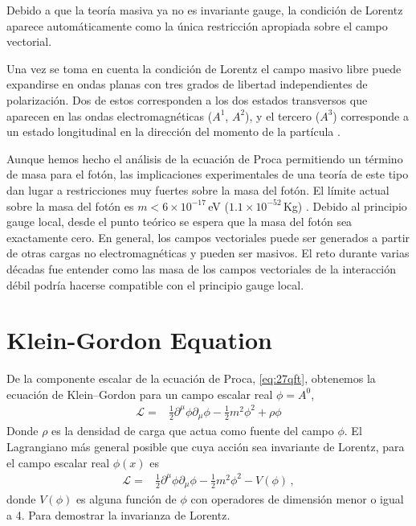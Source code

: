 Debido a que la teoría masiva ya no es invariante gauge, la condición
de Lorentz aparece automáticamente como la única restricción apropiada
sobre el campo vectorial.

Una vez se toma en cuenta la condición de Lorentz el campo masivo
libre puede expandirse en ondas planas con tres grados de libertad
independientes de polarización. Dos de estos corresponden a los dos
estados transversos que aparecen en las ondas electromagnéticas
($A^1$, $A^2$), y el tercero ($A^3$) corresponde a un estado
longitudinal en la dirección del momento de la partícula \cite{Gross}.

Aunque hemos hecho el análisis de la ecuación de Proca permitiendo un
término de masa para el fotón, las implicaciones experimentales de una
teoría de este tipo dan lugar a restricciones muy fuertes sobre la
masa del fotón\cite{Goldhaber:1971mr}. El límite actual sobre la masa
del fotón es $m\lt 6\times 10^{-17}\,$eV ($1.1\times 10^{-52}\,$Kg)
\cite{Yao:2006px}. Debido al principio gauge local, desde el punto
teórico se espera que la masa del fotón sea exactamente cero. En
general, los campos vectoriales puede ser generados a partir de otras
cargas no electromagnéticas y pueden ser masivos. El reto durante
varias décadas fue entender como las masa de los campos vectoriales de
la interacción débil podría hacerse compatible con el principio gauge
local.  


\section{Klein-Gordon Equation}
\label{sec:klein-gord-equat}

De la componente escalar de la ecuación de Proca, \eqref{eq:27qft}, obtenemos la ecuación de Klein--Gordon para un campo escalar real $\phi=A^0$,
\begin{align}
  \label{eq:kge}
  \mathcal{L}=&\frac{1}{2}\partial^\mu\phi\partial_\mu\phi-\frac{1}{2}m^2\phi^2+\rho\phi
\end{align}
Donde $\rho$ es la densidad de carga que actua como fuente del campo $\phi$. El Lagrangiano más general posible que cuya acción sea invariante de Lorentz, para el campo escalar real $\phi(x)$ es
\begin{align}
 \label{eq:kgeall}
   \mathcal{L}=&\frac{1}{2}\partial^\mu\phi\partial_\mu\phi-\frac{1}{2}m^2\phi^2-V(\phi)\,,
\end{align}
donde $V(\phi)$ es alguna función de $\phi$ con operadores de dimensión menor o igual a 4. Para demostrar la invarianza de Lorentz.

